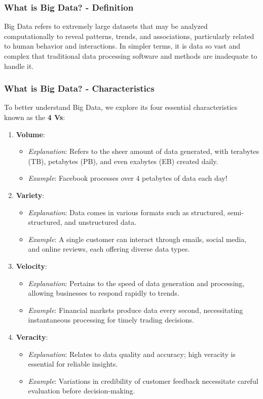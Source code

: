 \documentclass[aspectratio=169]{beamer}
\begin{document}
\begin{frame}[fragile]
    \frametitle{What is Big Data? - Definition}
    Big Data refers to extremely large datasets that may be analyzed computationally to reveal patterns, trends, and associations, particularly related to human behavior and interactions. In simpler terms, it is data so vast and complex that traditional data processing software and methods are inadequate to handle it.
\end{frame}

\begin{frame}[fragile]
    \frametitle{What is Big Data? - Characteristics}
    To better understand Big Data, we explore its four essential characteristics known as the \textbf{4 Vs}:
    
    \begin{enumerate}
        \item \textbf{Volume}:
        \begin{itemize}
            \item \textit{Explanation}: Refers to the sheer amount of data generated, with terabytes (TB), petabytes (PB), and even exabytes (EB) created daily.
            \item \textit{Example}: Facebook processes over 4 petabytes of data each day!
        \end{itemize}
        
        \item \textbf{Variety}:
        \begin{itemize}
            \item \textit{Explanation}: Data comes in various formats such as structured, semi-structured, and unstructured data.
            \item \textit{Example}: A single customer can interact through emails, social media, and online reviews, each offering diverse data types.
        \end{itemize}
        
        \item \textbf{Velocity}:
        \begin{itemize}
            \item \textit{Explanation}: Pertains to the speed of data generation and processing, allowing businesses to respond rapidly to trends.
            \item \textit{Example}: Financial markets produce data every second, necessitating instantaneous processing for timely trading decisions.
        \end{itemize}
        
        \item \textbf{Veracity}:
        \begin{itemize}
            \item \textit{Explanation}: Relates to data quality and accuracy; high veracity is essential for reliable insights.
            \item \textit{Example}: Variations in credibility of customer feedback necessitate careful evaluation before decision-making.
        \end{itemize}
    \end{enumerate}
\end{frame}
\end{document}
